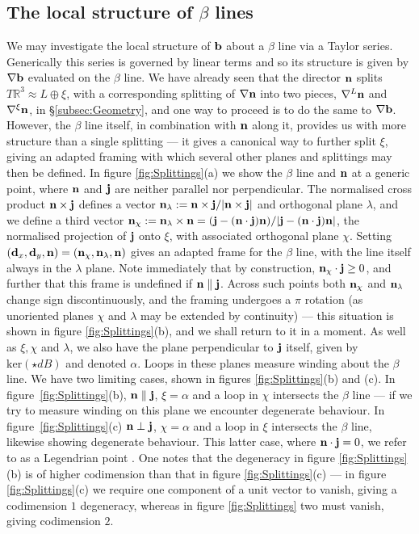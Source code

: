 \subsection{The local structure of $\beta$ lines}
\label{subsec:BendLocalStructure}
We may investigate the local structure of $\mathbf{b}$ about a $\beta$ line via a Taylor series. Generically this series is governed by linear terms and so its structure is given by $\nabla \mathbf{b}$ evaluated on the $\beta$ line. We have already seen that the director $\mathbf{n}$ splits $T \mathbb{R}^3\approx L \oplus \xi$, with a corresponding splitting of $\nabla \mathbf{n}$ into two pieces, $\nabla^L \mathbf{n} $ and $\nabla^\xi \mathbf{n}$, in \S\ref{subsec:Geometry}, and one way to proceed is to do the same to $\nabla \mathbf{b}$. However, the $\beta$ line itself, in combination with $\mathbf{n}$ along it, provides us with more structure than a single splitting --- it gives a canonical way to further split $\xi$, giving an adapted framing with which several other planes and splittings may then be defined. In figure \ref{fig:Splittings}(a) we show the $\beta$ line and $\mathbf{n}$ at a generic point, where $\mathbf{n}$ and $\mathbf{j}$ are neither parallel nor perpendicular. The normalised cross product $\mathbf{n} \times \mathbf{j}$ defines a vector $\mathbf{n}_\lambda := \mathbf{n} \times \mathbf{j}/| \mathbf{n} \times \mathbf{j}|$ and orthogonal plane $\lambda$, and we define a third vector $\mathbf{n}_\chi := \mathbf{n}_\lambda \times \mathbf{n} = (\mathbf{j} - (\mathbf{n}\cdot \mathbf{j})\mathbf{n})/|\mathbf{j} - (\mathbf{n}\cdot \mathbf{j})\mathbf{n}|$, the normalised projection of $\mathbf{j}$ onto $\xi$, with associated orthogonal plane $\chi$. Setting $(\mathbf{d}_x, \mathbf{d}_y, \mathbf{n}) = (\mathbf{n}_\chi, \mathbf{n}_\lambda, \mathbf{n})$ gives an adapted frame for the $\beta$ line, with the line itself always in the $\lambda$ plane. Note immediately that by construction, $\mathbf{n}_\chi \cdot \mathbf{j} \geq 0$, and further that this frame is undefined if $\mathbf{n} \parallel \mathbf{j}$. Across such points both $\mathbf{n}_\chi$ and $\mathbf{n}_\lambda$ change sign discontinuously, and the framing undergoes a $\pi$ rotation (as unoriented planes $\chi$ and $\lambda$ may be extended by continuity) --- this situation is shown in figure  \ref{fig:Splittings}(b), and we shall return to it in a moment. As well as $\xi, \chi$ and $\lambda$, we also have the plane perpendicular to $\mathbf{j}$ itself, given by $\mathrm{ker}(\star dB)$ and denoted $\alpha$. Loops in these planes measure winding about the $\beta$ line. We have two limiting cases, shown in figures \ref{fig:Splittings}(b) and (c). In figure~\ref{fig:Splittings}(b), $\mathbf{n} \parallel \mathbf{j}$, $\xi = \alpha$ and a loop in $\chi$ intersects the $\beta$ line --- if we try to measure winding on this plane we encounter degenerate behaviour. In figure~\ref{fig:Splittings}(c) $\mathbf{n} \perp \mathbf{j}$, $\chi = \alpha$ and a loop in $\xi$  intersects the $\beta$ line, likewise showing degenerate behaviour. This latter case, where $\mathbf{n} \cdot \mathbf{j}= 0$, we refer to as a Legendrian point \citep{Geiges2009}. One notes that the degeneracy in figure \ref{fig:Splittings}(b) is of higher codimension than that in figure \ref{fig:Splittings}(c) --- in figure \ref{fig:Splittings}(c) we require one component of a unit vector to vanish, giving a codimension $1$ degeneracy, whereas in figure \ref{fig:Splittings} two must vanish, giving codimension $2$.
